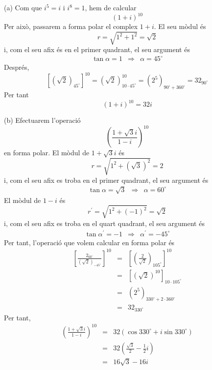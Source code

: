 \begin{solucio}
(a) Com que $i^{5}=i$ i $i^{8}=1$, hem de calcular
\[
(1+i)^{10}
\]
Per això, passarem a forma polar el complex $1+i$. El seu mòdul és
\[
r=\sqrt{1^{2}+1^{2}}=\sqrt{2}
\]
i, com el seu afix és en el primer quadrant, el seu argument és
\[
\begin{array}{lll}
\tan \alpha =1 & \Longrightarrow & \alpha =45
^{\circ}
\end{array}
\]
Després,
\[
\left[ \left( \sqrt{2}\right) _{45
^{\circ}
}\right] ^{10}=\left( \sqrt{2}\right) _{10\cdot 45
^{\circ}
}^{10}=\left( 2^{5}\right) _{90
^{\circ}
+360
^{\circ}
}=32_{90
^{\circ}
}
\]
Per tant
\[
(1+i)^{10}=32i
\]

(b) Efectuarem l’operació
\[
\left( \frac{1+\sqrt{3}i}{1-i}\right) ^{10}
\]
en forma polar. El mòdul de $1+\sqrt{3}i$ és
\[
r=\sqrt{1^{2}+\left( \sqrt{3}\right) ^{2}}=2
\]
i, com el seu afix es troba en el primer quadrant, el seu argument és
\[
\begin{array}{lll}
\tan \alpha =\sqrt{3} & \Longrightarrow & \alpha =60
^{\circ}
\end{array}
\]
El mòdul de $1-i$ és
\[
r^{\prime }=\sqrt{1^{2}+(-1)^{2}}=\sqrt{2}
\]
i, com el seu afix es troba en el quart quadrant, el seu argument és
\[
\begin{array}{lll}
\tan \alpha ^{\prime }=-1 & \Longrightarrow & \alpha ^{\prime }=-45
^{\circ}
\end{array}
\]
Per tant, l’operació que volem calcular en forma polar és
\begin{eqnarray*}
\left[ \frac{2_{60
^{\circ}
}}{\left( \sqrt{2}\right) _{-45
^{\circ}
}}\right] ^{10} &=&\left[ \left( \frac{2}{\sqrt{2}}\right) _{105
^{\circ}
}\right] ^{10} \\
&=&\left[ \left( \sqrt{2}\right) ^{10}\right] _{10\cdot 105
^{\circ}
} \\
&=&\left( 2^{5}\right) _{330
^{\circ}
+2\cdot 360
^{\circ}
} \\
&=&32_{330
^{\circ}
}
\end{eqnarray*}
Per tant,
\begin{eqnarray*}
\left( \frac{1+\sqrt{3}i}{1-i}\right) ^{10} &=&32(\cos 330
^{\circ}
+i\sin 330
^{\circ}
) \\
&=&32\left( \frac{\sqrt{3}}{2}-\frac{1}{2}i\right) \\
&=&16\sqrt{3}-16i
\end{eqnarray*}


\end{solucio}
